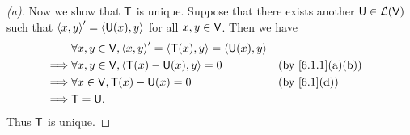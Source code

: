 \begin{proof}[(a)]
  Now we show that \(\mathsf{T}\) is unique.
  Suppose that there exists another \(\mathsf{U} \in \mathcal{L}(\mathsf{V})\) such that \(\left\langle x, y\right\rangle' = \left\langle\mathsf{U}(x), y\right\rangle\) for all \(x, y \in \mathsf{V}\).
  Then we have
  \begin{align*}
             & \forall x, y \in \V, \inn{x, y}' = \inn{\T(x), y} = \inn{\U(x), y}                      \\
    \implies & \forall x, y \in \V, \inn{\T(x) - \U(x), y} = 0                    &  & \by{6.1.1}[a,b] \\
    \implies & \forall x \in \V, \T(x) - \U(x) = 0                                &  & \by{6.1}[d]     \\
    \implies & \T = \U.
  \end{align*}
  Thus \(\mathsf{T}\) is unique.
\end{proof}

